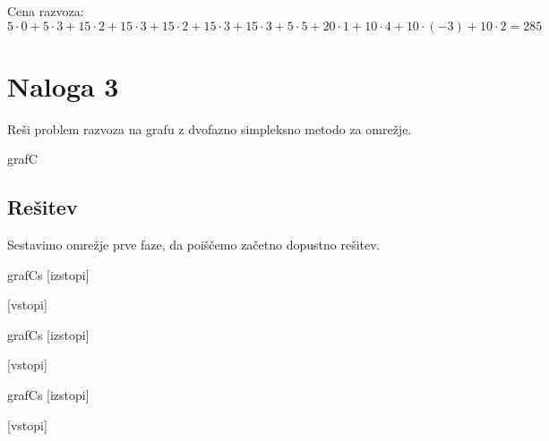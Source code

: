 \documentclass[14pt]{extarticle}
\begin{document}
Cena razvoza: $5 \cdot 0 + 5 \cdot 3 + 15 \cdot 2 + 15 \cdot 3 + 15 \cdot 2 + 15 \cdot 3 + 15 \cdot 3 + 5 \cdot 5 + 20 \cdot 1 + 10 \cdot 4 + 10 \cdot (-3) + 10 \cdot 2 = 285$

\clearpage
\section*{Naloga 3}

Reši problem razvoza na grafu
z dvofazno simpleksno metodo za omrežje.

\begin{razvoz}[scale=0.9]{grafC}
\end{razvoz}

\subsection*{Rešitev}

Sestavimo omrežje prve faze, da poiščemo začetno dopustno rešitev.

\begin{razvoz}[scale=0.9]{grafCs}
    [izstopi]


    [vstopi]
\end{razvoz}

\begin{razvoz}[scale=0.9]{grafCs}
    [izstopi]


    [vstopi]
\end{razvoz}

\begin{razvoz}[scale=0.9]{grafCs}
    [izstopi]


    [vstopi]
\end{razvoz}
\end{document}
